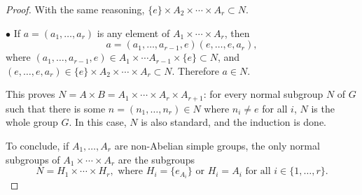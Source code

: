\documentclass[11pt,a4paper]{article}
\begin{document}
\begin{proof}
With the same reasoning, $\{e\}\times A_2 \times \cdots \times A_r \subset N.$

\item[$\bullet$]  If $a =(a_1,\ldots,a_r)$ is any element of $A_1\times \cdots \times A_r$, then
$$a = (a_1,\ldots,a_{r-1},e)(e,\ldots,e,a_r),$$
where $(a_1,\ldots,a_{r-1},e) \in A_1\times \cdots A_{r-1} \times \{e\} \subset N$, and $(e,\ldots,e,a_r) \in \{e\}\times A_2 \times\cdots \times A_r \subset N$. Therefore $a \in N$.

This proves $N = A \times B = A_1\times \cdots \times A_r \times A_{r+1}$: for every normal subgroup $N$ of $G$ such that there is some $n=(n_1,\ldots,n_r) \in N$ where $n_i \ne e$ for all $i$, $N$ is the whole group $G$. In this case, $N$ is also standard, and the induction is done.

To conclude, if $A_1,\ldots,A_r$ are non-Abelian simple groups, the only normal subgroups of $A_1\times\cdots \times A_r$ are the subgroups
$$N = H_1\times \cdots \times H_r, \text{ where } H_i = \{e_{A_i}\} \text{ or } H_i = A_i \text { for all } i \in \{1,\ldots,r\}.$$

\end{proof}
\end{document}
